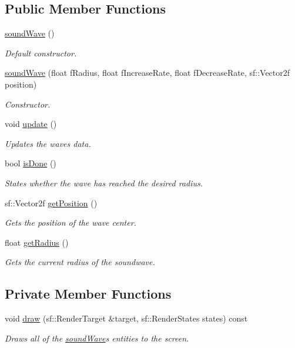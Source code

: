 \subsection*{Public Member Functions}
\begin{DoxyCompactItemize}
\item 
\hyperlink{classsound_wave_a4936f561d8cf68c073221d2bc4f2e55d}{sound\+Wave} ()
\begin{DoxyCompactList}\small\item\em Default constructor. \end{DoxyCompactList}\item 
\hyperlink{classsound_wave_a00d78cdbf7cd9bcdfe82571e9dc8f56b}{sound\+Wave} (float f\+Radius, float f\+Increase\+Rate, float f\+Decrease\+Rate, sf\+::\+Vector2f position)
\begin{DoxyCompactList}\small\item\em Constructor. \end{DoxyCompactList}\item 
void \hyperlink{classsound_wave_aafc6db924cda69359d9aa65ba75b28c6}{update} ()
\begin{DoxyCompactList}\small\item\em Updates the waves data. \end{DoxyCompactList}\item 
bool \hyperlink{classsound_wave_ae5709a35ac2c7772ddf41869ce2bb097}{is\+Done} ()
\begin{DoxyCompactList}\small\item\em States whether the wave has reached the desired radius. \end{DoxyCompactList}\item 
sf\+::\+Vector2f \hyperlink{classsound_wave_a46398f66c54a2868cf482b9a641e3770}{get\+Position} ()
\begin{DoxyCompactList}\small\item\em Gets the position of the wave center. \end{DoxyCompactList}\item 
float \hyperlink{classsound_wave_a1ef817617f2b8f7d69d0f2c2378a295a}{get\+Radius} ()
\begin{DoxyCompactList}\small\item\em Gets the current radius of the soundwave. \end{DoxyCompactList}\end{DoxyCompactItemize}
\subsection*{Private Member Functions}
\begin{DoxyCompactItemize}
\item 
void \hyperlink{classsound_wave_a902d890b915274312138a6d936be180a}{draw} (sf\+::\+Render\+Target \&target, sf\+::\+Render\+States states) const
\begin{DoxyCompactList}\small\item\em Draws all of the \hyperlink{classsound_wave}{sound\+Wave}\textquotesingle{}s entities to the screen. \end{DoxyCompactList}\end{DoxyCompactItemize}
